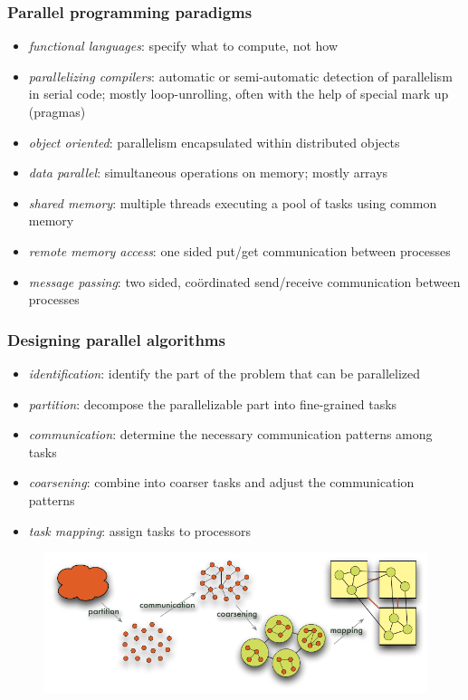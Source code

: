 \begin{frame}[fragile]
%
  \frametitle{Parallel programming paradigms}
%
  \begin{itemize}
%
  \item {\em functional languages}: specify what to compute, not how
  \item {\em parallelizing compilers}: automatic or semi-automatic detection of parallelism in
    serial code; mostly loop-unrolling, often with the help of special mark up (pragmas)
  \item {\em object oriented}: parallelism encapsulated within distributed objects

  \item {\em data parallel}: simultaneous operations on memory; mostly arrays
  \item {\em shared memory}: multiple threads executing a pool of tasks using common memory
  \item {\em remote memory access}: one sided put/get communication between processes
  \item {\em message passing}: two sided, co\"ordinated send/receive communication between
    processes
%
  \end{itemize}
%
\end{frame}

\begin{frame}[fragile]
%
  \frametitle{Designing parallel algorithms}
%
  \begin{itemize}
%
  \item {\em identification}: identify the part of the problem that can be parallelized
  \item {\em partition}: decompose the parallelizable part into fine-grained tasks
  \item {\em communication}: determine the necessary communication patterns among tasks
  \item {\em coarsening}: combine into coarser tasks and adjust the communication patterns
  \item {\em task mapping}: assign tasks to processors
%
  \end{itemize}
%
  \begin{figure}
    \centering
    \includegraphics[scale=0.75]{figures/parallelization-steps.pdf}
    \label{fig:parallelization-steps}
  \end{figure}
%
\end{frame}

